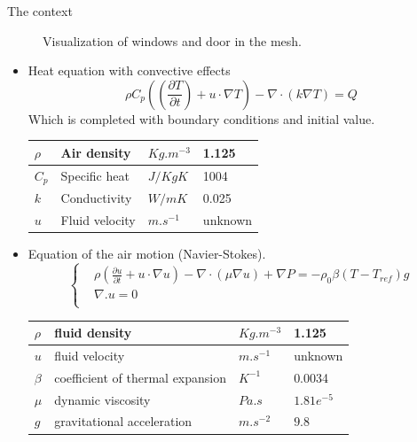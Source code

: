 \begin{frame}[allowframebreaks]{The context}
\begin{minipage}{0.48\linewidth}
\begin{figure}
        \caption{Visualization of windows and door in the mesh.}
    \end{figure}
\end{minipage}
\newpage
\begin{itemize}
    \item Heat equation with convective effects\\
    $$\rho C_p((\frac{\partial T}{\partial t})+u \cdot \nabla T)-\nabla \cdot (k \nabla T)=Q$$
    Which is completed with boundary conditions and initial value.
    \newline
    \newline
\renewcommand{\arraystretch}{2}
\begin{tabular}{|R{2cm}|C{2.5cm}|L{2.5cm}|L{2.5cm}|}
\hline
$\rho$ & Air density & $Kg.m^
{-3}$ & 1.125  \\[0.5cm]
\hline
$C_p$ & Specific heat & $J/KgK$ & 1004 \\[0.5cm]
\hline
$k$ & Conductivity & $W/mK$ & 0.025  \\[0.5cm]
\hline
$u$ & Fluid velocity & $m.s^{-1}$ & unknown \\[0.5cm]
\hline
\end{tabular}
\newpage
\item Equation of the air motion (Navier-Stokes).
 $$\left\{\begin{aligned} 
        &\rho (\frac{\partial u}{\partial t}+u\cdot \nabla u)-\nabla \cdot (\mu \nabla u)+\nabla P =-\rho_0 \beta(T-T_{ref})g\\
        &\nabla . u=0 \\
    \end{aligned}\right.$$
\renewcommand{\arraystretch}{2}
\begin{tabular}{|R{1cm}|C{5cm}|L{1.5cm}|L{1.5cm}|}
\hline
$\rho$ & fluid density & $Kg.m^
{-3}$ & 1.125 \\[0.7cm]
\hline
$u$ & fluid velocity & $m.s^{-1}$ & unknown \\[0.7cm]
\hline
$\beta$ & coefficient of thermal expansion & $K^
{-1}$ &  0.0034 \\[0.7cm]
\hline
$\mu$ & dynamic viscosity & $Pa.s$ & $1.81e^{-5}$\\[0.7cm]
\hline
$g$ & gravitational acceleration & $m.s^{-2}$ & $9.8$\\[0.7cm]
\hline
\end{tabular}


\end{itemize}
\end{frame}

